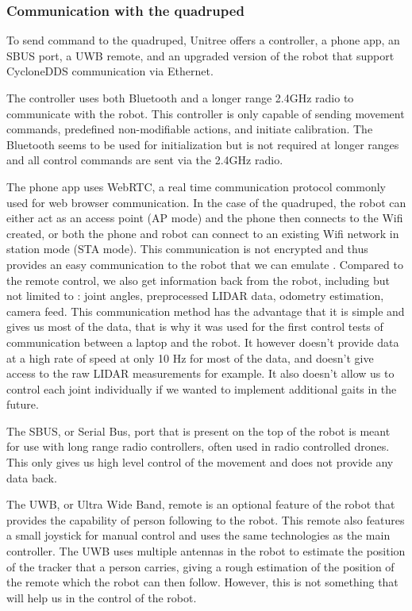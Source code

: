 \documentclass[12pt]{article}
\begin{document}
        
        \subsubsection{Communication with the quadruped}

        To send command to the quadruped, Unitree offers a controller, a phone app, an SBUS port, a UWB remote, and an upgraded version of the robot that support CycloneDDS communication via Ethernet.

        The controller uses both Bluetooth and a longer range 2.4GHz radio to communicate with the robot. This controller is only capable of sending movement commands, predefined non-modifiable actions, and initiate calibration. The Bluetooth seems to be used for initialization but is not required at longer ranges and all control commands are sent via the 2.4GHz radio.

        The phone app uses WebRTC, a real time communication protocol commonly used for web browser communication. In the case of the quadruped, the robot can either act as an access point (AP mode) and the phone then connects to the Wifi created, or both the phone and robot can connect to an existing Wifi network in station mode (STA mode). This communication is not encrypted and thus provides an easy communication to the robot that we can emulate \cite{go2_webrtc}. Compared to the remote control, we also get information back from the robot, including but not limited to : joint angles, preprocessed LIDAR data, odometry estimation, camera feed. This communication method has the advantage that it is simple and gives us most of the data, that is why it was used for the first control tests of communication between a laptop and the robot. It however doesn't provide data at a high rate of speed at only 10 Hz for most of the data, and doesn't give access to the raw LIDAR measurements for example. It also doesn't allow us to control each joint individually if we wanted to implement additional gaits in the future.

        The SBUS, or Serial Bus, port that is present on the top of the robot is meant for use with long range radio controllers, often used in radio controlled drones. This only gives us high level control of the movement and does not provide any data back.

        The UWB, or Ultra Wide Band, remote is an optional feature of the robot that provides the capability of person following to the robot. This remote also features a small joystick for manual control and uses the same technologies as the main controller. The UWB uses multiple antennas in the robot to estimate the position of the tracker that a person carries, giving a rough estimation of the position of the remote which the robot can then follow. However, this is not something that will help us in the control of the robot.
\end{document}
